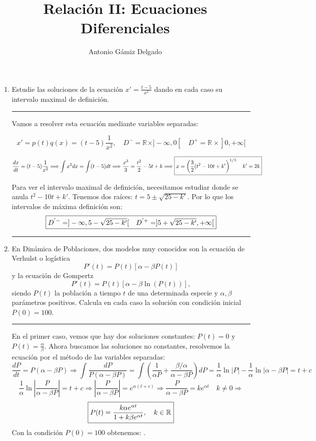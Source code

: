 \documentclass[12pt]{article}
\newcommand{\R}[1][]{\mathbb{R}^{#1}}
\newcommand{\solution}[1]{\text{\fbox{$#1$}}}
\newcommand{\abs}[1]{\left|#1\right|}
\begin{document}

\author{Antonio Gámiz Delgado}
\title{Relación II: Ecuaciones Diferenciales}
\maketitle


\begin{enumerate}
\hrule
\item Estudie las soluciones de la ecuación $\displaystyle x'=\frac{t-5}{x^2}$ dando en cada caso su intervalo maximal de definición. \\
\hrule

Vamos a resolver esta ecuación mediante variables separadas: 

\[
x'=p(t)q(x)=(t-5)\frac{1}{x^2}, \quad D^-=\R \times ]-\infty,0[ \quad D^+=\R \times ]0,+\infty[
\]

\[
\frac{dx}{dt}=(t-5)\frac{1}{x^2} \Longrightarrow \int x^2dx=\int (t-5)dt \Longrightarrow \frac{x^3}{3}=\frac{t^2}{2}-5t+k \Longrightarrow \solution{x = \left(\frac{3}{2}(t^2-10t+k'\right)^{1/3}\quad k'=2k}
\]



Para ver el intervalo maximal de definición, necesitamos estudiar donde se anula $t^2-10t+k'$. Tenemos dos raíces: $t = 5\pm \sqrt{25-k'}$. Por lo que los intervalos de máxima definición son:
\[
\solution{D^{'-}=]-\infty,5-\sqrt{25-k'}[ \quad D^{'+}=]5+\sqrt{25-k'},+\infty[}
\]

\hrule
\item En Dinámica de Poblaciones, dos modelos muy conocidos son la ecuación de Verhulst o logística
\[
P'(t)=P(t)[\alpha-\beta P(t)]
\]
y la ecuación de Gompertz
\[
P'(t)=P(t)[\alpha-\beta \ln(P(t))],
\]
siendo $P(t)$ la población a tiempo $t$ de una determinada especie y $\alpha, \beta$ parámetros positivos. Calcula en cada caso la solución con condición inicial $P(0)=100$. \\
\hrule

En el primer caso, vemos que hay dos soluciones constantes: $P(t)=0$ y $P(t)=\frac{\alpha}{\beta}$. Ahora buscamos las soluciones no constantes, resolvemos la ecuación por el método de las variables separadas:
\[
\frac{dP}{dt}=P(\alpha-\beta P) \Longrightarrow \int\frac{dP}{P(\alpha-\beta P)}=\int \left(\frac{1}{\alpha P} + \frac{\beta/\alpha}{\alpha - \beta P}\right)dP=\frac{1}{\alpha}\ln|P|-\frac{1}{\alpha}\ln|\alpha-\beta P|=t+c
\]
\[
\frac{1}{\alpha}\ln\abs{\frac{P}{\alpha-\beta P}}=t+c\Longrightarrow \abs{\frac{P}{\alpha-\beta P}} = e^{\alpha(t+c)} \Longrightarrow \frac{P}{\alpha-\beta P} = ke^{\alpha t} \quad k\neq 0 \Longrightarrow 
\]
\[
\solution{P(t)=\frac{k\alpha e^{\alpha t}}{1+k\beta e^{\alpha t}}, \quad k\in\R}
\]
Con la condición $P(0)=100$ obtenemos: \solution{k=\frac{100}{\alpha - 100\beta}}.


\end{enumerate}
\end{document}
